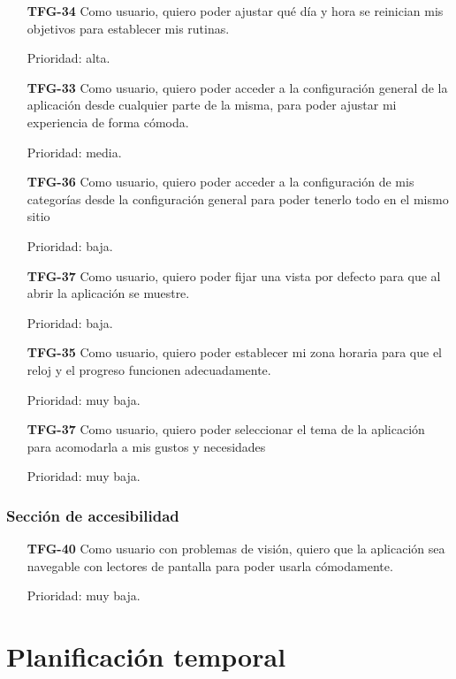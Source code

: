 \documentclass[10pt, a4paper]{aqademic}
\begin{document}
\begin{itemize}[leftmargin=16mm]
	\item [\textbf{TFG-34}] Como usuario, quiero poder ajustar qué día y hora se reinician mis objetivos para establecer mis rutinas.
	
	Prioridad: alta.
	
	\item [\textbf{TFG-33}] Como usuario, quiero poder acceder a la configuración general de la aplicación desde cualquier parte de la misma, para poder ajustar mi experiencia de forma cómoda.
	
	Prioridad: media.
	
	\item [\textbf{TFG-36}] Como usuario, quiero poder acceder a la configuración de mis categorías desde la configuración general para poder tenerlo todo en el mismo sitio
	
	Prioridad: baja.
	
	\item [\textbf{TFG-37}] Como usuario, quiero poder fijar una vista por defecto para que al abrir la aplicación se muestre.
	
	Prioridad: baja.
	
	\item [\textbf{TFG-35}] Como usuario, quiero poder establecer mi zona horaria para que el reloj y el progreso funcionen adecuadamente.

	Prioridad: muy baja.
	
	\item [\textbf{TFG-37}] Como usuario, quiero poder seleccionar el tema de la aplicación para acomodarla a mis gustos y necesidades 
	
	Prioridad: muy baja.
\end{itemize}

\subsubsection*{Sección de accesibilidad}

\begin{itemize}[leftmargin=16mm]
	\item [\textbf{TFG-40}] Como usuario con problemas de visión, quiero que la aplicación sea navegable con lectores de pantalla para poder usarla cómodamente.
	
	Prioridad: muy baja. 
\end{itemize}


\section{Planificación temporal}
\end{document}
